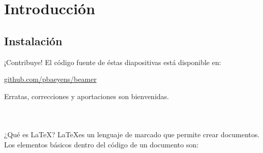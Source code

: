 \section{Introducción}

\subsection{Instalación}

\begin{frame}{¡Contribuye!}
  El código fuente de éstas diapositivas está disponible en:
\begin{center}
  \huge \href{http://github.com/pbaeyens/beamer}{github.com/pbaeyens/beamer}
\end{center}
  Erratas, correcciones y aportaciones son bienvenidas.
  \espacio
  \begin{columns}[c]
      \hyperlink{beamer}{}
      \hyperlink{latex}{}
  \end{columns}
\end{frame}

\begin{frame}{¿Qué es \LaTeX?}
  \hypertarget<1>{latex}{}
  \LaTeX es un lenguaje de marcado que permite crear documentos. Los elementos
  básicos dentro del código de un documento son:
  \espacio
  \begin{overlayarea}{\textwidth}{5cm}

  \end{overlayarea}
\end{frame}

